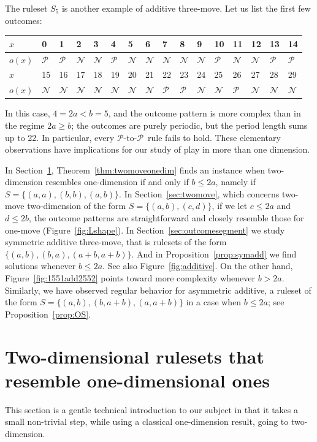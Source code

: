 \documentclass{amsart}
\theoremstyle{plain}
\theoremstyle{definition}
\newcommand{\N}{\ensuremath{\mathcal N}}
\renewcommand{\P}{\ensuremath{\mathcal P}}
\renewcommand{\ge}{\geqslant}
\renewcommand{\le}{\leqslant}
\renewcommand{\leq}{\leqslant}
\begin{document}
The ruleset $S_5$ is another example of  {\sc additive three-move}.
Let us list the first few outcomes: 
\vspace{2 mm} 

\begin{center}
\begin{tabular}{|l|l|l|l|l|l|l|l|l|l|l|l|l|l|l|l|}
\hline
$x$    & 0  & 1  & 2  & 3  & 4  & 5  & 6  & 7  & 8  & 9  & 10 & 11 & 12 & 13 & 14 \\ \hline
$o(x)$ & $\P$  & $\P$  & $\N$  & $\N$  & $\P$  & $\N$  & $\N$ & $\N$  & $\N$  & $\N$  & $\P$  & $\N$  & $\N$  & $\P$  & $\P$  \\ \hline
$x$    & 15 & 16 & 17 & 18 & 19 & 20 & 21 & 22 & 23 & 24 & 25 & 26 & 27 & 28 & 29 \\ \hline
$o(x)$ & $\N$  & $\N$  & $\N$  & $\N$  & $\N$  & $\N$  & $\N$  & $\P$  & $\P$  & $\N$  & $\N$  & $\P$  & $\N$  & $\N$  & $\N$  \\ \hline
\end{tabular}
\end{center}
In this case, $4 = 2a< b = 5$, and the outcome pattern is more complex than in the regime $2a \ge b$; the outcomes are purely periodic, but the period length sums up to 22. In particular, every  \P-to-\P\ rule fails to hold. These elementary observations have implications for our study of play in more than one dimension.

In Section~\ref{sec:2dresemble1d}, Theorem~\ref{thm:twomoveonedim} finds an instance when {\sc two-dimension} resembles {\sc one-dimension} if and only if $b\le 2a$, namely if $S=\{(a,a),(b,b),(a,b)\}$. In Section~\ref{sec:twomove}, which concerns {\sc two-move two-dimension} of the form $S=\{(a,b),(c,d)\}$, if we let $c \leq 2a$ and $d \leq 2b$, the outcome patterns are straightforward and closely resemble those for {\sc one-move} (Figure~\ref{fig:Lshape}). In  Section~\ref{sec:outcomesegment} we study {\sc symmetric additive three-move}, that is rulesets of the form $\{(a,b),(b,a),(a+b,a+b)\}$. And in Proposition~\ref{prop:symadd} we find solutions whenever $b\le 2a$. See also Figure~\ref{fig:additive}. On the other hand,  Figure~\ref{fig:1551add2552} points toward more complexity whenever $b>2a$. Similarly, we have observed regular behavior for {\sc asymmetric additive}, a ruleset of the form $S=\{(a,b),(b,a+b), (a,a+b)\}$ in a case when $b\le2a$; see Proposition~\ref{prop:OS}. 

\section{Two-dimensional rulesets that resemble one-dimensional  ones}
\label{sec:2dresemble1d}
This section is a gentle technical introduction to our subject in that it takes a small non-trivial step, while using a classical {\sc one-dimension} result, going to {\sc two-dimension}. 
\end{document}
